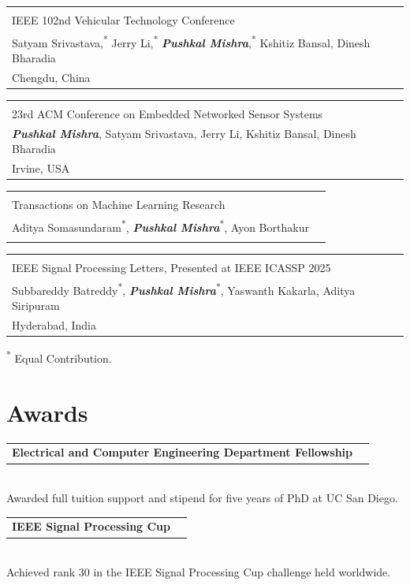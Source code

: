 \documentclass[10pt, letterpaper]{article}
\makeatletter
\let\hrefWithoutArrow\href
\renewcommand{\href}[2]{\hrefWithoutArrow{#1}{\ifthenelse{\equal{#2}{}}{ }{#2 }\raisebox{.15ex}{\footnotesize \faExternalLink*}}}
\newcommand{\publicationEntry}[6]{%
  \begin{samepage}%
    \noindent
    \begin{tabular*}{\textwidth}{@{\extracolsep{\fill}} l r}
      \begin{minipage}[t]{0.68\textwidth}%
        \hypersetup{urlcolor=black}%
        \textbf{\href{#2}{#1}}\\[0.05cm]%
        \hypersetup{urlcolor=primaryColor}%
        #4\\[0.05cm]%
        #3%
      \end{minipage}%
      &
      \begin{minipage}[t]{0.3\textwidth}%
        \raggedleft
        #5\\%
        #6%
      \end{minipage}%
    \end{tabular*}%
  \end{samepage}%
  \vspace{0.35cm}%
}
\newcommand{\equalAuthor}[1]{#1\textsuperscript{*}}
\newcommand{\awardEntry}[3]{%
  \begin{samepage}%
    \noindent
    \begin{tabular*}{\textwidth}{@{\extracolsep{\fill}} l r}
      \textbf{#1} & \raggedleft #3 \\
    \end{tabular*}%
    \vspace{0.05cm}\\
    #2
  \end{samepage}%
  \vspace{0.35cm}%
}
\makeatother
\begin{document}
\publicationEntry
  {A Realistic Radar Simulator for End-to-End Autonomous Driving in CARLA} %
  {https://wcsng.ucsd.edu/c-shenron/} %
  {
    \equalAuthor{Satyam Srivastava,} 
    \equalAuthor{Jerry Li,} 
    \equalAuthor{\textbf{\textit{Pushkal Mishra}},} 
    Kshitiz Bansal, 
    Dinesh Bharadia
  } %
  {IEEE 102nd Vehicular Technology Conference} %
  {Oct 2025} %
  {Chengdu, China} %

\publicationEntry
  {Demo: Radar Simulator for CARLA} %
  {https://doi.org/10.1145/3715014.3724379} %
  {
    \textbf{\textit{Pushkal Mishra}}, 
    Satyam Srivastava, 
    Jerry Li, 
    Kshitiz Bansal, 
    Dinesh Bharadia
  } %
  {23rd ACM Conference on Embedded Networked Sensor Systems} %
  {May 2025} %
  {Irvine, USA} %

\publicationEntry
  {Learning Using a Single Forward Pass} %
  {https://openreview.net/forum?id=EDQ8QOGqjr/} %
  {
    \equalAuthor{Aditya Somasundaram}, 
    \equalAuthor{\textbf{\textit{Pushkal Mishra}}}, 
    Ayon Borthakur
  } %
  {Transactions on Machine Learning Research} %
  {Jun 2025} %
  {} %

\publicationEntry
  {Inpainting-Driven Graph Learning via Explainable Neural Networks} %
  {https://ieeexplore.ieee.org/abstract/document/10756724} %
  {
    \equalAuthor{Subbareddy Batreddy}, 
    \equalAuthor{\textbf{\textit{Pushkal Mishra}}}, 
    Yaswanth Kakarla, 
    Aditya Siripuram
  } %
  {IEEE Signal Processing Letters, Presented at IEEE ICASSP 2025} %
  {Apr 2025} %
  {Hyderabad, India} %

\vspace{-0.2cm}
{\footnotesize \raggedleft \textsuperscript{*} Equal Contribution.\par}
\vspace{-0.2cm}

\section{Awards}

\awardEntry
    {Electrical and Computer Engineering Department Fellowship}
    {Awarded full tuition support and stipend for five years of PhD at UC San Diego.}
    {2024}

\awardEntry
    {IEEE Signal Processing Cup}
    {Achieved rank 30 in the IEEE Signal Processing Cup challenge held worldwide.}
    {2023}
\end{document}
